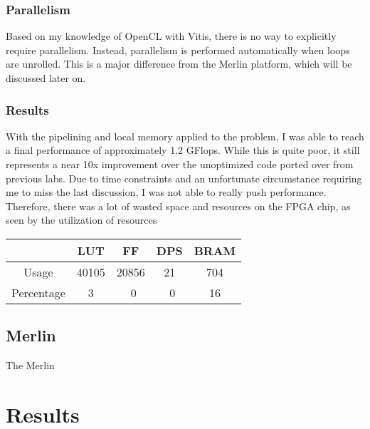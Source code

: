 \documentclass[letterpaper,twocolumn,10pt]{article}
\begin{document}
\subsubsection{Parallelism}
Based on my knowledge of OpenCL with Vitis, there is no way to explicitly
require parallelism. Instead, parallelism is performed automatically when loops
are unrolled. This is a major difference from the Merlin platform, which will
be discussed later on.
\subsubsection{Results}
With the pipelining and local memory applied to the problem, I was able to
reach a final performance of approximately 1.2 GFlops. While this is quite
poor, it still represents a near 10x improvement over the unoptimized code
ported over from previous labs. Due to time constraints and an unfortunate
circumstance requiring me to miss the last discussion, I was not able to really
push performance. Therefore, there was a lot of wasted space and resources on
the FPGA chip, as seen by the utilization of resources
\begin{center}
    \begin{tabular}{|c|c|c|c|c|}
        \hline
        & LUT & FF & DPS & BRAM \\ \hline
        Usage & 40105 & 20856 & 21 & 704 \\ \hline
        Percentage & 3 & ~0 & ~0 & 16 \\ \hline
    \end{tabular}
\end{center}
\subsection{Merlin}
The Merlin 
\section{Results}

\end{document}
